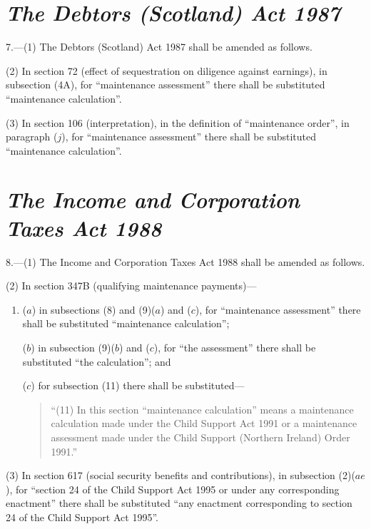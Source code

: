 \documentclass[12pt,a4paper]{article}
\begin{document}
\section*{\itshape The Debtors (Scotland) Act 1987}

7.---(1) The Debtors (Scotland) Act 1987 shall be amended as follows.

(2) In section 72 (effect of sequestration on diligence against earnings), in subsection (4A), for “maintenance assessment” there shall be substituted “maintenance calculation”.

(3) In section 106 (interpretation), in the definition of “maintenance order”, in paragraph ($j$), for “maintenance assessment” there shall be substituted “maintenance calculation”.


\section*{\itshape The Income and Corporation Taxes Act 1988}

8.---(1) The Income and Corporation Taxes Act 1988 shall be amended as follows.

(2) In section 347B (qualifying maintenance payments)—
\begin{enumerate}\item[]
($a$) in subsections (8)  and (9)($a$)  and ($c$), for “maintenance assessment” there shall be substituted “maintenance calculation”;

($b$) in subsection (9)($b$)  and ($c$), for “the assessment” there shall be substituted “the calculation”; and

($c$) for subsection (11)  there shall be substituted—
\begin{quotation}
“(11) In this section “maintenance calculation” means a maintenance calculation made under the Child Support Act 1991 or a maintenance assessment made under the Child Support (Northern Ireland) Order 1991.”
\end{quotation}
\end{enumerate}

(3) In section 617 (social security benefits and contributions), in subsection (2)($ae$), for “section 24 of the Child Support Act 1995 or under any corresponding enactment” there shall be substituted “any enactment corresponding to section 24 of the Child Support Act 1995”.
\end{document}
